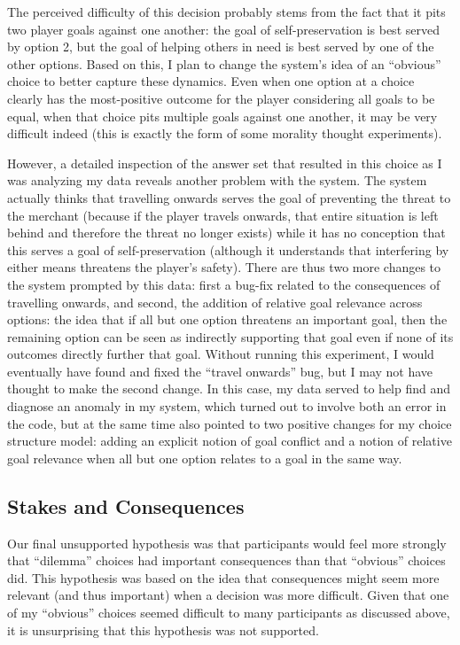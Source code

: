 The perceived difficulty of this decision probably stems from the fact that it pits two player goals against one another: the goal of self-preservation is best served by option 2, but the goal of helping others in need is best served by one of the other options.
%
Based on this, I plan to change the system's idea of an ``obvious'' choice to better capture these dynamics.
%
Even when one option at a choice clearly has the most-positive outcome for the player considering all goals to be equal, when that choice pits multiple goals against one another, it may be very difficult indeed (this is exactly the form of some morality thought experiments).


However, a detailed inspection of the answer set that resulted in this choice as I was analyzing my data reveals another problem with the system.
%
The system actually thinks that travelling onwards serves the goal of preventing the threat to the merchant (because if the player travels onwards, that entire situation is left behind and therefore the threat no longer exists) while it has no conception that this serves a goal of self-preservation (although it understands that interfering by either means threatens the player's safety).
%
There are thus two more changes to the system prompted by this data: first a bug-fix related to the consequences of travelling onwards, and second, the addition of relative goal relevance across options: the idea that if all but one option threatens an important goal, then the remaining option can be seen as indirectly supporting that goal even if none of its outcomes directly further that goal.
%
Without running this experiment, I would eventually have found and fixed the ``travel onwards'' bug, but I may not have thought to make the second change.
%
In this case, my data served to help find and diagnose an anomaly in my system, which turned out to involve both an error in the code, but at the same time also pointed to two positive changes for my choice structure model: adding an explicit notion of goal conflict and a notion of relative goal relevance when all but one option relates to a goal in the same way.

\subsection{Stakes and Consequences}

Our final unsupported hypothesis was that participants would feel more strongly that ``dilemma'' choices had important consequences than that ``obvious'' choices did.
%
This hypothesis was based on the idea that consequences might seem more relevant (and thus important) when a decision was more difficult.
%
Given that one of my ``obvious'' choices seemed difficult to many participants as discussed above, it is unsurprising that this hypothesis was not supported.


